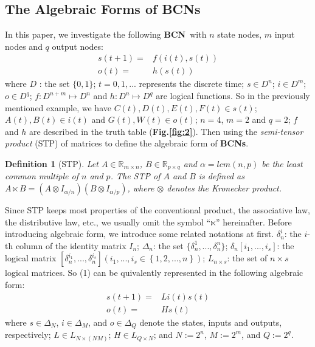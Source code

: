 \documentclass[letterpaper, 10 pt, conference]{ieeeconf}  %
\newtheorem{definition}{Definition}
\def \BCN {{\bf BCN}}
\begin{document}
\subsection{The Algebraic Forms of BCNs}
In this paper, we investigate the following \BCN\ with $n$ state nodes, $m$ input nodes and $q$ output nodes:
\begin{equation}
\begin{split}
s(t+1)=&f(i(t),s(t))\\
o(t)=&h(s(t))
\end{split}
\end{equation}
where $D$ : the set $\{0,1\}$; $t=0,1,...$ represents the discrete time; $s\in D^n$; $i\in D^m$; $o\in D^q$; $f:D^{n+m}\mapsto D^n$ and $h:D^n\mapsto D^q$ are logical functions. So in the previously mentioned example, we have $C(t), D(t), E(t), F(t)\in s(t)$; $A(t), B(t)\in i(t)$ and $G(t), W(t)\in o(t)$; $n=4$, $m=2$ and $q=2$; $f$ and $h$ are described in the truth table ({\bf Fig.\ref{fig:2}}). Then using the \emph{semi-tensor product}  (STP) of matrices to define the algebraic form of {\bf BCNs}. 

\begin{definition}[STP] 
	Let $A\in\mathbb{R}_{m\times n}$, $B\in\mathbb{R}_{p\times q}$ and $\alpha=lcm(n,p)$ be the least common multiple of $n$ and $p$. The STP of $A$ and $B$ is defined as $A\ltimes B=(A\otimes I_{\alpha/n})(B\otimes I_{\alpha/p})$, where $\otimes$ denotes the Kronecker product. 
\end{definition}

Since STP keeps most properties of the conventional product, the associative law, the distributive law, etc., we usually omit the symbol ``$\ltimes$'' hereinafter. Before introducing algebraic form, we introduce some related notations at first. $\delta^i_n$: the $i$-th column of the identity matrix $I_n$; $\Delta_n$: the set $\{\delta^1_n,...,\delta^n_n \}$; $\delta_n \left[i_1,...,i_s\right]$: the logical matrix $\left[\delta^{i_1}_n,...,\delta^{i_s}_n\right]\left(i_1,...,i_s\in\left\{1,2,...,n\right\}\right)$; $L_{n\times s}$: the set of $n\times s$ logical matrices. So (1) can be quivalently represented in the following algebraic form:
\begin{equation}
\begin{split}
s(t+1)=&Li(t)s(t)\\
o(t)=&Hs(t)
\end{split}
\end{equation}
where $s\in\Delta_N$, $i\in\Delta_M$, and  $o\in\Delta_Q$ denote the states, inputs and outputs, respectively; $L\in L_{N\times\left(NM\right)}$; $H\in L_{Q\times N}$; and $N:=2^n$, $M:=2^m$, and $Q:=2^q$.
\end{document}
